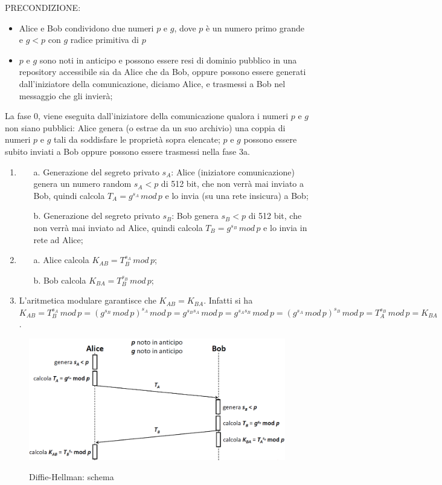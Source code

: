 PRECONDIZIONE: 
\begin{itemize}
\item Alice e Bob condividono due numeri $p$ e $g$, dove $p$ è un numero primo grande e $g<p$ con $g$ radice primitiva di $p$
\item $p$ e $g$ sono noti in anticipo e possono essere resi di dominio pubblico in una repository accessibile sia da Alice che da Bob, oppure possono essere generati dall'iniziatore della comunicazione,
diciamo Alice, e trasmessi a Bob nel messaggio che gli invierà;
\end{itemize}
La fase 0, viene eseguita dall'iniziatore della comunicazione qualora i numeri $p$ e $g$ non siano pubblici: Alice genera (o estrae da un suo archivio) una coppia di numeri $p$ e $g$ tali da soddisfare le proprietà sopra elencate; $p$ e $g$ possono essere subito inviati a Bob oppure possono essere trasmessi nella fase 3a.
\begin{enumerate}
\item \begin{enumerate}
\item [a.] Generazione del segreto privato $s_{A}$: Alice (iniziatore comunicazione) genera un numero random $s_{A}<p$ di 512 bit, che non verrà mai inviato a Bob, quindi calcola $T_{A}=g^{s_{A}} \, mod \,p$ e lo invia (su una rete insicura) a Bob;
\item [b.] Generazione del segreto privato $s_{B}$: Bob genera $s_{B}<p$ di 512 bit, che non verrà mai inviato ad Alice, quindi calcola $T_{B}=g^{s_{B}} \, mod \, p$ e lo invia in rete ad Alice;
\end{enumerate}
\item \begin{enumerate}
\item [a.] Alice calcola $K_{AB}=T_{B}^{s_{A}} \, mod \,p$;
\item [b.] Bob calcola $K_{BA}=T_{B}^{s_{B}} \, mod \, p$;
\end{enumerate}
\item L'aritmetica modulare garantisce che $K_{AB}=K_{BA}$. Infatti si ha $ K_{AB} = T_{B}^{s_{A}} \, mod \,p = ({g^{s_{B}} \, mod \, p})^{s_{A}} \, mod \,p = g^{s_{B}s_{A}} \, mod \, p = g^{s_{A}s_{B}} \, mod \, p = ({g^{s_{A}} \, mod \, p})^{s_{B}} \, mod \,p = T_{A}^{s_{B}} \, mod \, p = K_{BA}$.
\end{enumerate}
\begin{figure}[htbp]
	\centering%
	\subfigure%
	{\includegraphics[scale=0.5, keepaspectratio]{Immagini/chiave_pubblica/DiffieHellman_schema.png}}
	\caption{Diffie-Hellman: schema}
	\end{figure}

